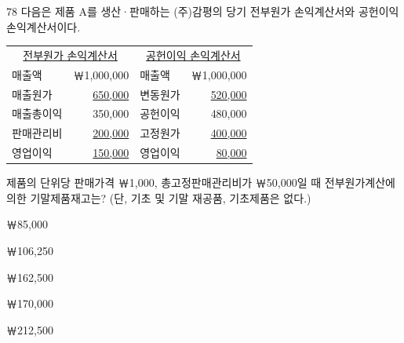 \begin{question}{78}
다음은 제품 A를 생산·판매하는 (주)감평의 당기 전부원가 손익계산서와 공헌이익 손익계산서이다.
\begin{framedtext}
{\small\begin{tabular}{@{}lr|lr@{}}
\multicolumn{2}{c|}{\uline{전부원가 손익계산서}} & \multicolumn{2}{c}{\uline{공헌이익 손익계산서}} \\
매출액 & ￦1,000,000 & 매출액 & ￦1,000,000 \\
매출원가 & \uline{650,000} & 변동원가 & \uline{520,000} \\
매출총이익 & 350,000 & 공헌이익 & 480,000 \\
판매관리비 & \uline{200,000} & 고정원가 & \uline{400,000} \\
영업이익 & \uline{150,000} & 영업이익 & \uline{80,000} \\
\end{tabular}\par}
\end{framedtext}
제품의 단위당 판매가격 ￦1,000, 총고정판매관리비가 ￦50,000일 때 전부원가계산에 의한 기말제품재고는? (단, 기초 및 기말 재공품, 기초제품은 없다.)
\begin{choices}
  \item ￦85,000
  \item ￦106,250
  \item ￦162,500
  \item ￦170,000
  \item ￦212,500
\end{choices}
\end{question}
